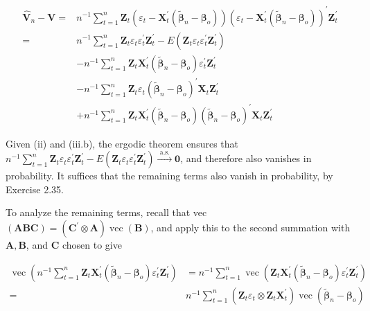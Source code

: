 \documentclass[10pt]{article}
\begin{document}
$$
\begin{aligned}
\hat{\mathbf{V}}_{n}-\mathbf{V}= & n^{-1} \sum_{t=1}^{n} \mathbf{Z}_{t}\left(\varepsilon_{t}-\mathbf{X}_{t}^{\prime}\left(\tilde{\boldsymbol{\beta}}_{n}-\boldsymbol{\beta}_{o}\right)\right)\left(\varepsilon_{t}-\mathbf{X}_{t}^{\prime}\left(\tilde{\boldsymbol{\beta}}_{n}-\boldsymbol{\beta}_{o}\right)\right)^{\prime} \mathbf{Z}_{t}^{\prime} \\
= & n^{-1} \sum_{t=1}^{n} \mathbf{Z}_{t} \varepsilon_{t} \varepsilon_{t}^{\prime} \mathbf{Z}_{t}^{\prime}-E\left(\mathbf{Z}_{t} \varepsilon_{t} \varepsilon_{t}^{\prime} \mathbf{Z}_{t}^{\prime}\right) \\
& -n^{-1} \sum_{t=1}^{n} \mathbf{Z}_{t} \mathbf{X}_{t}^{\prime}\left(\tilde{\boldsymbol{\beta}}_{n}-\boldsymbol{\beta}_{o}\right) \varepsilon_{t}^{\prime} \mathbf{Z}_{t}^{\prime} \\
& -n^{-1} \sum_{t=1}^{n} \mathbf{Z}_{t} \varepsilon_{t}\left(\tilde{\boldsymbol{\beta}}_{n}-\boldsymbol{\beta}_{o}\right)^{\prime} \mathbf{X}_{t} \mathbf{Z}_{t}^{\prime} \\
& +n^{-1} \sum_{t=1}^{n} \mathbf{Z}_{t} \mathbf{X}_{t}^{\prime}\left(\tilde{\boldsymbol{\beta}}_{n}-\boldsymbol{\beta}_{o}\right)\left(\tilde{\boldsymbol{\beta}}_{n}-\boldsymbol{\beta}_{o}\right)^{\prime} \mathbf{X}_{t} \mathbf{Z}_{t}^{\prime}
\end{aligned}
$$

Given (ii) and (iii.b), the ergodic theorem ensures that $n^{-1} \sum_{t=1}^{n} \mathbf{Z}_{t} \varepsilon_{t} \varepsilon_{t}^{\prime} \mathbf{Z}_{t}^{\prime}- E\left(\mathbf{Z}_{t} \varepsilon_{t} \varepsilon_{t}^{\prime} \mathbf{Z}_{t}^{\prime}\right) \xrightarrow{\text { a.s. }} \mathbf{0}$, and therefore also vanishes in probability. It suffices that the remaining terms also vanish in probability, by Exercise 2.35.

To analyze the remaining terms, recall that vec $(\mathbf{A B C})=\left(\mathbf{C}^{\prime} \otimes \mathbf{A}\right) \operatorname{vec}(\mathbf{B})$, and apply this to the second summation with $\mathbf{A}, \mathbf{B}$, and $\mathbf{C}$ chosen to give

$$
\begin{aligned}
\operatorname{vec}\left(n^{-1} \sum_{t=1}^{n} \mathbf{Z}_{t} \mathbf{X}_{t}^{\prime}\left(\tilde{\boldsymbol{\beta}}_{n}-\boldsymbol{\beta}_{o}\right) \varepsilon_{t}^{\prime} \mathbf{Z}_{t}^{\prime}\right) & =n^{-1} \sum_{t=1}^{n} \operatorname{vec}\left(\mathbf{Z}_{t} \mathbf{X}_{t}^{\prime}\left(\tilde{\boldsymbol{\beta}}_{n}-\boldsymbol{\beta}_{o}\right) \varepsilon_{t}^{\prime} \mathbf{Z}_{t}^{\prime}\right) \\
= & n^{-1} \sum_{t=1}^{n}\left(\mathbf{Z}_{t} \varepsilon_{t} \otimes \mathbf{Z}_{t} \mathbf{X}_{t}^{\prime}\right) \operatorname{vec}\left(\tilde{\boldsymbol{\beta}}_{n}-\boldsymbol{\beta}_{o}\right)
\end{aligned}
$$
\end{document}
